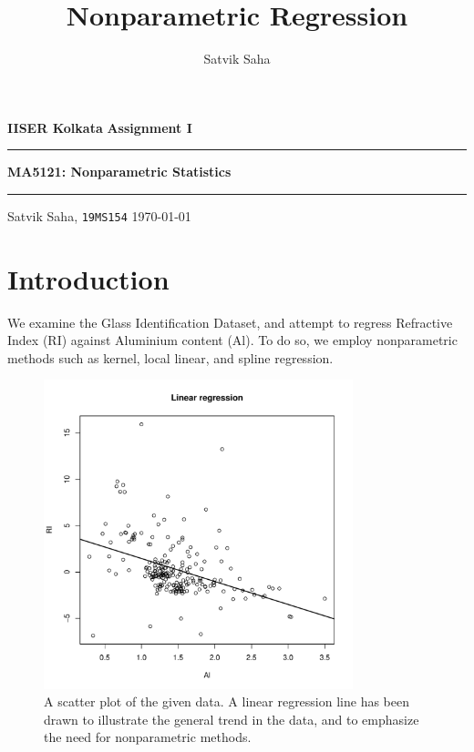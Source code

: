 \documentclass[10pt]{article}
\title{Nonparametric Regression}
\author{Satvik Saha}
\date{}
\begin{document}
    \noindent\textbf{IISER Kolkata} \hfill \textbf{Assignment I}
    \vspace{3pt}
    \hrule
    \vspace{3pt}
    \begin{center}
    \LARGE{\textbf{MA5121: Nonparametric Statistics}}
    \end{center}
    \vspace{3pt}
    \hrule
    \vspace{3pt}
    Satvik Saha, \texttt{19MS154} \hfill \today
    \vspace{20pt}

    \setlength{\parskip}{1em}


    \section{Introduction}

    We examine the Glass Identification Dataset, and attempt to regress
    Refractive Index (RI) against Aluminium content (Al). To do so, we employ
    nonparametric methods such as kernel, local linear, and spline regression.

    \begin{figure}[H]
    \begin{center}
        \includegraphics[page = 1, width = 0.8\textwidth]{glass.pdf}
    \end{center}
    \caption{
        A scatter plot of the given data. A linear regression line has been
        drawn to illustrate the general trend in the data, and to emphasize
        the need for nonparametric methods.
    }
    \label{fig:glass_linear}
    \end{figure}
\end{document}
